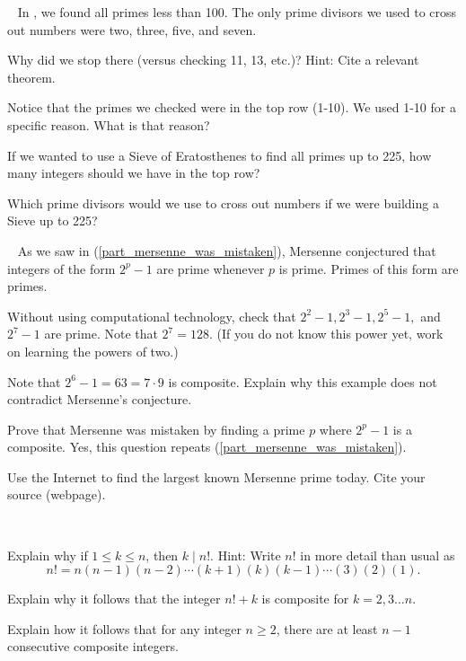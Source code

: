 \begin{exer}[\exerU] %
\label{exer_extending_sieve} 
~
    In , we found all primes less than 100.  The only prime divisors we used to cross out numbers were two, three, five, and seven.  
        \begin{exerpart}
            \item Why did we stop there (versus checking 11, 13, etc.)?  Hint: Cite a relevant theorem.
            \item Notice that the primes we checked were in the top row (1-10).  We used 1-10 for a specific reason.  What is that reason?
            \item If we wanted to use a Sieve of Eratosthenes to find all primes up to 225, how many integers should we have in the top row?
            \item Which prime divisors would we use to cross out numbers if we were building a Sieve up to 225?
        \end{exerpart}
\end{exer}

\begin{exer}[\exerU] %
\label{exer_mersenne_primes}  
~
    As we saw in (\ref{part_mersenne_was_mistaken}), Mersenne conjectured that integers of the form $2^p-1$ are prime whenever $p$ is prime.  Primes of this form are  primes.
        \begin{exerpart}
            \item Without using computational technology, check that $2^2-1, 2^3-1, 2^5-1,$ and $2^7-1$ are prime. Note that $2^7=128$. (If you do not know this power yet, work on learning the powers of two.)
            \item Note that $2^6-1 = 63=7 \cdot 9$ is composite.   Explain why this example does not contradict Mersenne's conjecture.
            \item Prove that Mersenne was mistaken by finding a prime $p$ where $2^p-1$ is a composite. Yes, this question repeats  (\ref{part_mersenne_was_mistaken}).
            \item Use the Internet to find the largest known Mersenne prime today.  Cite your source (webpage).
        \end{exerpart}
\end{exer}

\begin{exer}[\exerU] %
\label{exer_consecutive_composites}
~
    \begin{exerpart}
        \item Explain why if $1 \le k \le n$, then $k \mid n!$.  Hint: Write $n!$ in more detail than usual as 
        $$n! = n(n-1)(n-2) \cdots (k+1)(k)(k-1) \cdots (3)(2)(1).$$
        \item  Explain why it follows that the integer $n! + k$ is composite for $k=2,3 \ldots n$.
        \item Explain how it follows that for any integer $n\ge2$, there are at least $n-1$ consecutive composite integers.
    \end{exerpart}  
\end{exer}

